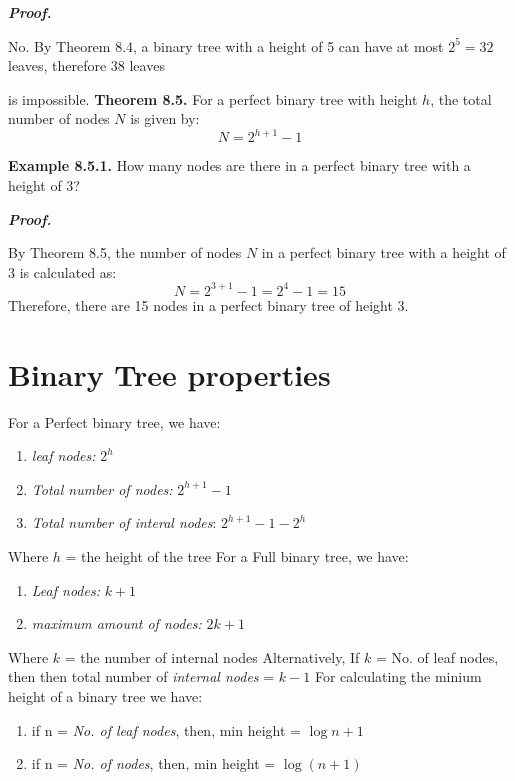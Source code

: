 \documentclass{report}
\begin{document}
\noindent \textbf{\textit{Proof.}}  \vspace{1.5mm}

No. By Theorem 8.4, a binary tree with a height of 5 can have at most \( 2^5 = 32 \) leaves, therefore 38 leaves 

is impossible.
\bigbreak \noindent \bigbreak \noindent
\textbf{Theorem 8.5.} For a perfect binary tree with height \( h \), the total number of nodes \( N \) is given by:
\[
N = 2^{h+1} - 1
\]

\bigbreak \noindent
\textbf{Example 8.5.1.} How many nodes are there in a perfect binary tree with a height of 3? \vspace{2mm}

\noindent \textbf{\textit{Proof.}} \vspace{2mm}

By Theorem 8.5, the number of nodes \( N \) in a perfect binary tree with a height of 3 is calculated as:
\[
N = 2^{3+1} - 1 = 2^4 - 1 = 15
\]
Therefore, there are 15 nodes in a perfect binary tree of height 3.
\section{Binary Tree properties}
For a Perfect binary tree, we have:
\begin{enumerate}
  \item \textit{leaf nodes:} $2^h$
  \item \textit{Total number of nodes:} $2^{h+1} -1$
  \item \textit{Total number of interal nodes}: $2^{h+1} - 1 - 2^h$
\end{enumerate}
Where $h$ = the height of the tree
\bigbreak \noindent
For a Full binary tree, we have:
\begin{enumerate}
  \item \textit{Leaf nodes:} $k+1$
  \item \textit{maximum amount of nodes:} $2k+1$
\end{enumerate}
\noindent Where $k$ = the number of internal nodes
\bigbreak \noindent
Alternatively, If $k$ = No. of leaf nodes, then then total number of \textit{internal nodes} = $k -1$
\bigbreak \noindent
For calculating the minium height of a binary tree we have:
\begin{enumerate}
  \item if n = \textit{No. of leaf nodes}, then, min height = $\log{n} + 1$
  \item if n = \textit{No. of nodes}, then, min height = $\log{(n+1)}$
\end{enumerate}
\end{document}
